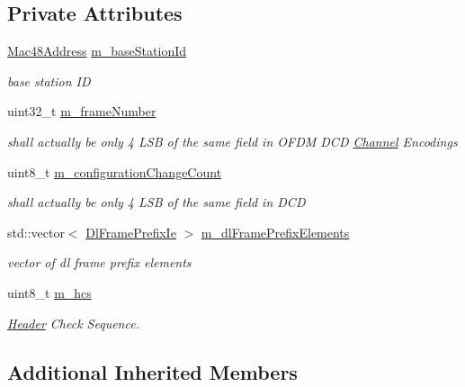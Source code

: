 \subsection*{Private Attributes}
\begin{DoxyCompactItemize}
\item 
\hyperlink{classns3_1_1Mac48Address}{Mac48\+Address} \hyperlink{classns3_1_1OfdmDownlinkFramePrefix_a7b67a172f45eb5c21475fae2b1ccadc0}{m\+\_\+base\+Station\+Id}
\begin{DoxyCompactList}\small\item\em base station ID \end{DoxyCompactList}\item 
uint32\+\_\+t \hyperlink{classns3_1_1OfdmDownlinkFramePrefix_a000a256bcb20f919dae6c434205f7c6d}{m\+\_\+frame\+Number}
\begin{DoxyCompactList}\small\item\em shall actually be only 4 L\+SB of the same field in O\+F\+DM D\+CD \hyperlink{classns3_1_1Channel}{Channel} Encodings \end{DoxyCompactList}\item 
uint8\+\_\+t \hyperlink{classns3_1_1OfdmDownlinkFramePrefix_a46c640590dd0d172932b724d951408e4}{m\+\_\+configuration\+Change\+Count}
\begin{DoxyCompactList}\small\item\em shall actually be only 4 L\+SB of the same field in D\+CD \end{DoxyCompactList}\item 
std\+::vector$<$ \hyperlink{classns3_1_1DlFramePrefixIe}{Dl\+Frame\+Prefix\+Ie} $>$ \hyperlink{classns3_1_1OfdmDownlinkFramePrefix_a5556a09adf1ba07c0ff0d024c163ea8e}{m\+\_\+dl\+Frame\+Prefix\+Elements}
\begin{DoxyCompactList}\small\item\em vector of dl frame prefix elements \end{DoxyCompactList}\item 
uint8\+\_\+t \hyperlink{classns3_1_1OfdmDownlinkFramePrefix_a886434776ca438227fbb61411b289f2a}{m\+\_\+hcs}
\begin{DoxyCompactList}\small\item\em \hyperlink{classns3_1_1Header}{Header} Check Sequence. \end{DoxyCompactList}\end{DoxyCompactItemize}
\subsection*{Additional Inherited Members}


